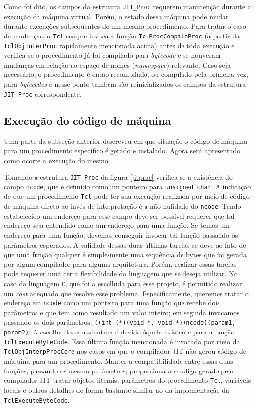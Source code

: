 Como foi dito, os campos da estrutura \verb!JIT_Proc! requerem
manutenção durante a execução da máquina virtual. Porém, o estado dessa
máquina pode mudar durante execuções subsequentes de um mesmo
procedimento. Para tratar o caso de mudanças, a \texttt{Tcl} sempre invoca a
função \verb!TclProcCompileProc! (a partir da \verb!TclObjInterProc!
rapidamente mencionada acima) antes de toda execução e verifica se o
procedimento já foi compilado para \textit{bytecode} e se houveram
mudanças em relação ao espaço de nomes (\textit{namespace})
relevante. Caso seja necessário, o procedimento é então recompilado,
ou compilado pela primeira vez, para \textit{bytecodes} e nesse ponto
também são reinicializados os campos da estrutura \verb!JIT_Proc!
correspondente.


\subsection{Execução do código de máquina}
\label{codeexec}
Uma parte da subseção anterior descreveu em que situação o código de
máquina para um procedimento específico é gerado e instalado. Agora será
apresentado como ocorre a execução do mesmo.

Tomando a estrutura \verb!JIT_Proc! da figura \ref{jitproc}
verifica-se a existência do campo \verb!ncode!, que é definido como
um ponteiro para \verb!unsigned char!. A indicação de que um
procedimento \texttt{Tcl} pode ter sua execução realizada por meio de
código de máquina direto ao invés de interpretação é a não nulidade do
\verb!ncode!. Tendo estabelecido um endereço para esse campo deve ser
possível requerer que tal endereço seja entendido como um endereço para
uma função. Se temos um endereço para uma função, devemos conseguir
invocar tal função passando os parâmetros esperados. A validade dessas
duas últimas tarefas se deve ao fato de que uma função qualquer é
simplesmente uma sequência de bytes que foi gerada por algum
compilador para alguma arquitetura. Porém, realizar essas tarefas pode
requerer uma certa flexibilidade da linguagem que se deseja
utilizar. No caso da linguagem \texttt{C}, que foi a escolhida para
esse projeto, é permitido realizar um \textit{cast} adequado que
resolve esse problema. Especificamente, queremos tratar o endereço em
\verb!ncode! como um ponteiro para uma função que recebe dois
parâmetros e que tem como resultado um valor inteiro;
em seguida invocamos passando os dois parâmetros:
\verb!((int (*)(void *, void *))ncode)(param1, param2)!. A escolha
dessa assinatura é devido àquela existente para a função
\verb!TclExecuteByteCode!. Essa última função mencionada é invocada
por meio da \verb!TclObjInterpProcCore! nos casos em que o compilador
JIT não gerou código de máquina para um procedimento. Manter a
compatibilidade entre essas duas funções, passando os mesmo
parâmetros, proporciona ao código gerado pelo compilador JIT tratar
objetos literais, parâmetros do procedimento \texttt{Tcl}, variáveis
locais e outros detalhes de forma bastante similar ao da
implementação da \verb!TclExecuteByteCode!.


